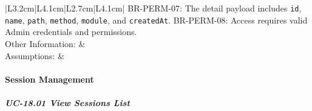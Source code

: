 {\begin{longtable}{|L{3.2cm}|L{4.1cm}|L{2.7cm}|L{4.1cm}|}
{BR-PERM-07: The detail payload includes \texttt{id}, \texttt{name}, \texttt{path}, \texttt{method}, \texttt{module}, and \texttt{createdAt}. \newline
BR-PERM-08: Access requires valid Admin credentials and permissions.
} \\ \hline
Other Information: &  \\ \hline
Assumptions: &  \\ \hline
\end{longtable}
}

\paragraph{Session Management}

\subparagraph{UC-18.01 View Sessions List}


